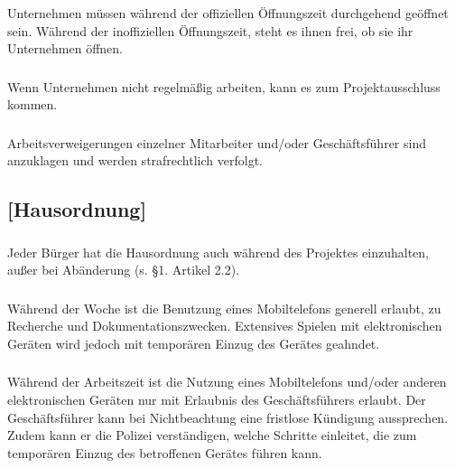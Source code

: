 \documentclass[a4paper, 11pt]{report}
\let\oldsubsection\subsection
\renewcommand{\subsection}{\leftskip=40pt\oldsubsection}
\begin{document}
\subsubsection{}
Unternehmen müssen während der offiziellen Öffnungszeit durchgehend geöffnet sein. Während der inoffiziellen Öffnungszeit, steht es ihnen frei, ob sie ihr Unternehmen öffnen. 

\subsubsection{}
Wenn Unternehmen nicht regelmäßig arbeiten, kann es zum Projektausschluss kommen. 

\subsubsection{}
Arbeitsverweigerungen einzelner Mitarbeiter und/oder Geschäftsführer sind anzuklagen und werden strafrechtlich verfolgt. 



\subsection{[Hausordnung]}


\subsubsection{}
Jeder Bürger hat die Hausordnung auch während des Projektes einzuhalten, außer bei Abänderung (s. §1. Artikel 2.2). 

\subsubsection{}
Während der Woche ist die Benutzung eines Mobiltelefons generell erlaubt, zu Recherche und Dokumentationszwecken. Extensives Spielen mit elektronischen Geräten wird jedoch mit temporären Einzug des Gerätes geahndet.

\subsubsection{}
Während der Arbeitszeit ist die Nutzung eines Mobiltelefons und/oder anderen elektronischen Geräten nur mit Erlaubnis des Geschäftsführers erlaubt. Der Geschäftsführer kann bei Nichtbeachtung eine fristlose Kündigung aussprechen. Zudem kann er die Polizei verständigen, welche Schritte einleitet, die zum temporären Einzug des betroffenen Gerätes führen kann.
\end{document}
